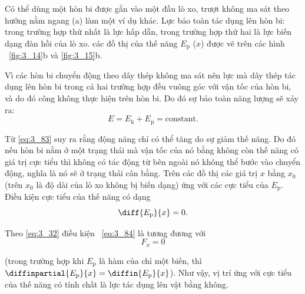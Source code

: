 Có thể dùng một hòn bi được gắn vào một đầu lò xo, trượt không ma sát theo hướng nằm ngang (a) làm một ví dụ khác. Lực bảo toàn tác dụng lên hòn bi: trong trường hợp thứ nhất là lực hấp dẫn, trong trường hợp thứ hai là lực biến dạng đàn hồi của lò xo. các đồ thị của thế năng $E_{\text{p}}$ ($x$) được vẽ trên các hình ~\ref{fig:3_14}b và \ref{fig:3_15}b.

Vì các hòn bi chuyển động theo dây thép không ma sát nên lực mà dây thép tác dụng lên hòn bi trong cả hai trường hợp đều vuông góc với vận tốc của hòn bi, và do đó công không thực hiện trên hòn bi. Do đó sự bảo toàn năng lượng sẽ xảy ra: 
\begin{equation}\label{eq:3_83}
E = E_{\text{k}} + E_{\text{p}} = \text{constant}.
\end{equation}

\noindent
Từ \eqref{eq:3_83} suy ra rằng động năng chỉ có thể tăng do sự giảm thế năng. Do đó nếu hòn bi nằm ở một trạng thái mà vận tốc của nó bằng không còn thế năng có giá trị cực tiểu thì không có tác động từ bên ngoài nó không thể bước vào chuyển động, nghĩa là nó sẽ ở trạng thái cân bằng. 
Trên các đồ thị các giá trị $x$ bằng $x_0$ (trên  $x_0$ là độ dài của lò xo không bị biến dạng) ứng với các cực tiểu của $E_{\text{p}}$. Điều kiện cực tiểu của thế năng có dạng 
\begin{equation}\label{eq:3_84}
\diff{E_{\text{p}}}{x} = 0.
\end{equation}

\noindent
Theo \eqref{eq:3_32} điều kiện ~\eqref{eq:3_84} là tương đương với 
\begin{equation}\label{eq:3_85}
F_x = 0
\end{equation}

\noindent
(trong trường hợp khi $E_{\text{p}}$ là hàm của chỉ một biến, thì $\diffinpartial{E_{\text{p}}}{x}=\diffin{E_{\text{p}}}{x}$). Như vậy, vị trí ứng với cực tiểu của thế năng có tính chất là lực tác dụng lên vật bằng không.

